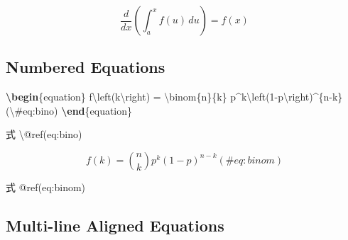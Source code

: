 \documentclass[oneside]{book}
\newenvironment{Shaded}{\begin{snugshade}}{\end{snugshade}}
\newcommand{\ExtensionTok}[1]{#1}
\newcommand{\FunctionTok}[1]{\textcolor[rgb]{0.00,0.00,0.00}{#1}}
\newcommand{\KeywordTok}[1]{\textcolor[rgb]{0.13,0.29,0.53}{\textbf{#1}}}
\newcommand{\NormalTok}[1]{#1}
\newcommand{\SpecialCharTok}[1]{\textcolor[rgb]{0.00,0.00,0.00}{#1}}
\newcommand{\SpecialStringTok}[1]{\textcolor[rgb]{0.31,0.60,0.02}{#1}}
\begin{document}
\begin{equation*} 
\frac{d}{dx}\left( \int_{a}^{x} f(u)\,du\right)=f(x)
\end{equation*}

\hypertarget{numbered-equations}{%
\subsection{Numbered Equations}\label{numbered-equations}}

\begin{Shaded}
\begin{Highlighting}[]
\KeywordTok{\textbackslash{}begin}\NormalTok{\{}\ExtensionTok{equation}\NormalTok{\}}\SpecialStringTok{ }
\SpecialStringTok{  f}\SpecialCharTok{\textbackslash{}left}\SpecialStringTok{(k}\SpecialCharTok{\textbackslash{}right}\SpecialStringTok{) = }\SpecialCharTok{\textbackslash{}binom}\SpecialStringTok{\{n\}\{k\} p^k}\SpecialCharTok{\textbackslash{}left}\SpecialStringTok{(1-p}\SpecialCharTok{\textbackslash{}right}\SpecialStringTok{)^\{n-k\}}
\SpecialStringTok{  (}\SpecialCharTok{\textbackslash{}#}\SpecialStringTok{eq:bino)}
\KeywordTok{\textbackslash{}end}\NormalTok{\{}\ExtensionTok{equation}\NormalTok{\} }

\NormalTok{式 }\FunctionTok{\textbackslash{}@ref}\NormalTok{(eq:bino)}
\end{Highlighting}
\end{Shaded}

\begin{equation} 
  f\left(k\right) = \binom{n}{k} p^k\left(1-p\right)^{n-k}
  (\#eq:binom)
\end{equation}

式 @ref(eq:binom)

\hypertarget{multi-line-aligned-equations}{%
\subsection{Multi-line Aligned Equations}\label{multi-line-aligned-equations}}
\end{document}
